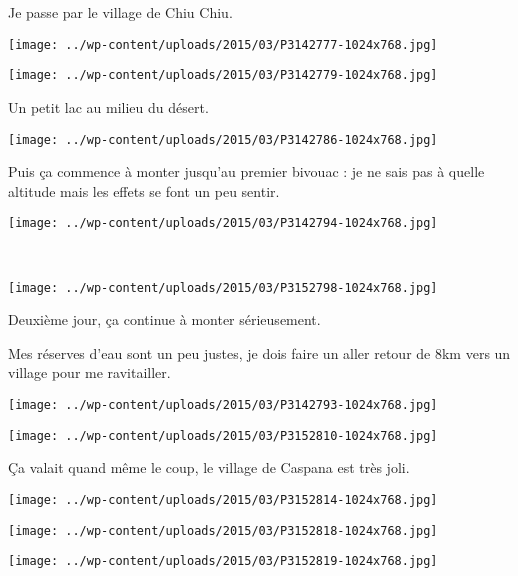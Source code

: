 \pagebreak
Je passe par le village de Chiu Chiu.
\begin{center} \texttt{[image: ../wp-content/uploads/2015/03/P3142777-1024x768.jpg]} \end{center}
\begin{center} \texttt{[image: ../wp-content/uploads/2015/03/P3142779-1024x768.jpg]} \end{center}
\vspace{-\topsep}
\vspace{-3.25mm}

\pagebreak
Un petit lac au milieu du désert.
\begin{center} \texttt{[image: ../wp-content/uploads/2015/03/P3142786-1024x768.jpg]} \end{center}

Puis ça commence à monter jusqu'au premier bivouac : je ne sais pas à quelle altitude mais les effets se font un peu sentir.\\
\begin{center} \texttt{[image: ../wp-content/uploads/2015/03/P3142794-1024x768.jpg]} \end{center}
\vspace{-\topsep}
\pagebreak
~
\begin{center} \texttt{[image: ../wp-content/uploads/2015/03/P3152798-1024x768.jpg]} \end{center}

 Deuxième jour, ça continue à monter sérieusement.

 Mes réserves d'eau sont un peu justes, je dois faire un aller retour de 8km vers un village pour me ravitailler. 
\begin{center} \texttt{[image: ../wp-content/uploads/2015/03/P3142793-1024x768.jpg]} \end{center}
\begin{center} \texttt{[image: ../wp-content/uploads/2015/03/P3152810-1024x768.jpg]} \end{center}

 Ça valait quand même le coup, le village de Caspana est très joli.
\begin{center} \texttt{[image: ../wp-content/uploads/2015/03/P3152814-1024x768.jpg]} \end{center}
\begin{center} \texttt{[image: ../wp-content/uploads/2015/03/P3152818-1024x768.jpg]} \end{center}
\vfill
\begin{center} \texttt{[image: ../wp-content/uploads/2015/03/P3152819-1024x768.jpg]} \end{center}
\vspace{-\topsep}
\vspace{-0.75mm}

